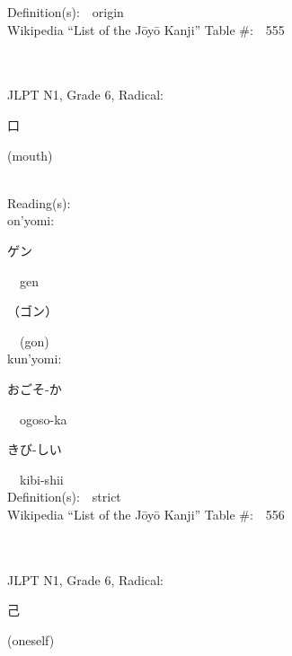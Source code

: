 \begin{multicols}{2}
Definition(s):\ \ origin \\
Wikipedia ``List of the J\=oy\=o Kanji'' Table \#:\ \ 555 \\
\ \ \\
{\fontsize{34pt}{40pt}  }\ \ \\  %
{JLPT N1, Grade 6, Radical:\ \ {\begin{CJK}{UTF8}{min} 口 \end{CJK}} (mouth) } \\
Reading(s):\ \ \\
{\hspace*{1em}}on'yomi:\ \ \\
{\hspace*{2em}}{\begin{CJK}{UTF8}{min} ゲン \end{CJK}}\ \ gen\ \ \\
{\hspace*{2em}}{\begin{CJK}{UTF8}{min} （ゴン） \end{CJK}}\ \ (gon)\ \ \\
{\hspace*{1em}}kun'yomi:\ \ \\
{\hspace*{2em}}{\begin{CJK}{UTF8}{min} おごそ-か \end{CJK}}\ \ ogoso-ka\ \ \\
{\hspace*{2em}}{\begin{CJK}{UTF8}{min} きび-しい \end{CJK}}\ \ kibi-shii\ \ \\
Definition(s):\ \ strict \\
Wikipedia ``List of the J\=oy\=o Kanji'' Table \#:\ \ 556 \\
\ \ \\
{\fontsize{34pt}{40pt}  }\ \ \\  %
{JLPT N1, Grade 6, Radical:\ \ {\begin{CJK}{UTF8}{min} 己 \end{CJK}} (oneself) } \\

\end{multicols}
